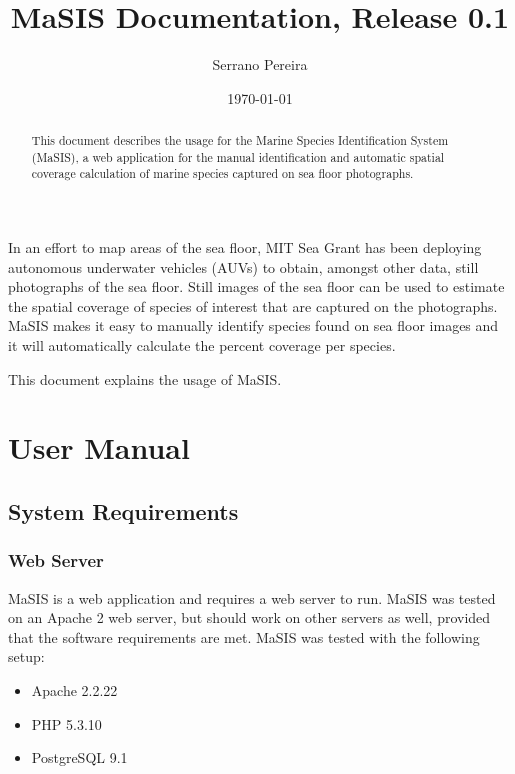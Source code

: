 \documentclass[twoside,a4paper]{refart}
\title{MaSIS Documentation, Release 0.1}
\author{Serrano Pereira}
\date{\today}
\begin{document}
\maketitle

\begin{abstract}
    This document describes the usage for the Marine Species Identification System (MaSIS), a web application for the manual identification and automatic spatial coverage calculation of marine species captured on sea floor photographs.
\end{abstract}

In an effort to map areas of the sea floor, MIT Sea Grant has been deploying autonomous underwater vehicles (AUVs) to obtain, amongst other data, still photographs of the sea floor. Still images of the sea floor can be used to estimate the spatial coverage of species of interest that are captured on the photographs. MaSIS makes it easy to manually identify species found on sea floor images and it will automatically calculate the percent coverage per species.

This document explains the usage of MaSIS.

\tableofcontents

\newpage

\section{User Manual}

\subsection{System Requirements}
\label{requirements}

\subsubsection{Web Server}

MaSIS is a web application and requires a web server to run. MaSIS was tested on an Apache 2 web server, but should work on other servers as well, provided that the software requirements are met. MaSIS was tested with the following setup:

\begin{itemize}
\item Apache 2.2.22
\item PHP 5.3.10
\item PostgreSQL 9.1
\end{itemize}
\end{document}
